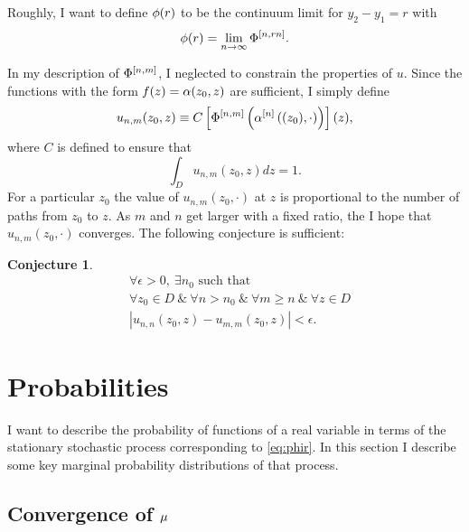 \documentclass[twocolumn]{article}
\newtheorem{conj}{Conjecture}
\begin{document}
Roughly, I want to define $\phi(r)$ to be the continuum limit for
$y_2 - y_1 =r$ with
\begin{equation}
  \label{eq:phir}
  \phi(r) = \lim_{n \rightarrow \infty} \Phi^{[n,rn]}.
\end{equation}

In my description of $\Phi^{[n,m]}$, I neglected to constrain the
properties of $u$.  Since the functions with the form $f(z) =
\alpha(z_0,z)$ are sufficient, I simply define
\begin{equation}
  \label{eq:def}
  u_{n,m}(z_0,z) \equiv C \left[ \Phi^{[n,m]} \left( \alpha^{[n]}
      \left( (z_0), \cdot \right) \right) \right](z),
\end{equation}
where $C$ is defined to ensure that
\begin{equation*}
  \int_D u_{n,m}(z_0,z) dz = 1.
\end{equation*}
For a particular $z_0$ the value of $u_{n,m}(z_0,\cdot)$ at $z$ is
proportional to the number of paths from $z_0$ to $z$.  As $m$ and $n$
get larger with a fixed ratio, the I hope that $u_{n,m}(z_0,\cdot)$
converges.  The following conjecture is sufficient:
\begin{conj}
  \label{conj}
  \begin{align*}
    & \forall \epsilon > 0,~ \exists n_0 \text{ such that } \\
    & \forall z_0 \in D ~\&~ \forall n > n_0 ~\&~ \forall m \geq n ~\&~
              \forall z \in D\\
    & \left| u_{n,n}(z_0,z) - u_{m,m}(z_0,z) \right| < \epsilon.
  \end{align*}
\end{conj}

\section{Probabilities}
\label{sec:limist}

I want to describe the probability of functions of a real variable in
terms of the stationary stochastic process corresponding to
\eqref{eq:phir}.  In this section I describe some key marginal
probability distributions of that process.

\subsection{Convergence of $\mu$}
\label{sec:convergence}
\end{document}
